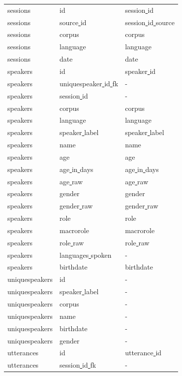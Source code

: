 \documentclass[a4paper, 11pt]{book}
\newcommand{\und}{\underline{{ }}\hspace{0.2mm}}	%
\begin{document}
\begin{longtable}[ht!]{lll}
		sessions 				& id					& session\und id \\
		sessions 				& source\und id			& session\und id\und source \\
		sessions 				& corpus				& corpus \\
		sessions 				& language				& language \\
		sessions 				& date					& date \\
		speakers				& id 					& speaker\und id \\
		speakers				& uniquespeaker\und id\und fk 	& - \\
		speakers				& session\und id 		& - \\
		speakers				& corpus				& corpus \\
		speakers				& language				& language \\
		speakers				& speaker\und label 	& speaker\und label \\
		speakers				& name					& name \\
		speakers				& age					& age \\
		speakers				& age\und in\und days 	& age\und in\und days \\
		speakers				& age\und raw			& age\und raw \\
		speakers				& gender 				& gender \\
		speakers				& gender\und raw		& gender\und raw \\
		speakers				& role					& role \\
		speakers				& macrorole				& macrorole \\
		speakers				& role\und raw			& role\und raw \\
		speakers				& languages\und spoken 	& - \\
		speakers				& birthdate				& birthdate \\
		uniquespeakers 			& id					& - \\
		uniquespeakers 			& speaker\und label		& - \\
		uniquespeakers 			& corpus				& - \\
		uniquespeakers 			& name					& - \\
		uniquespeakers 			& birthdate				& - \\
		uniquespeakers 			& gender				& - \\			
		utterances				& id					& utterance\und id \\
		utterances				& session\und id\und fk	& - \\

\end{longtable}
\end{document}
